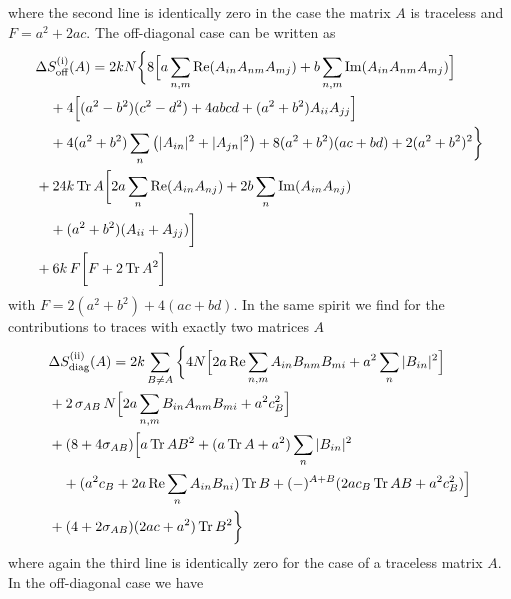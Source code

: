 \documentclass[10pt,a4paper]{article}
\newcommand{\RN}[1]{%
    \textup{\uppercase\expandafter{\romannumeral#1}}%
}
\DeclareMathOperator{\Tr}{Tr}
\begin{document}
where the second line is identically zero in the case the matrix $A$
is traceless and $F=a^2+2ac$.
The off-diagonal case can be written as
\begin{align}
  &\Delta S^{(\RN{1})}_{\text{off}} (A) = 2k N \bigg\{
      8 \Big[ a \sum_{n,m} \operatorname{Re} (A_{in} A_{nm} A_{mj}) +
      b \sum_{n,m} \operatorname{Im} (A_{in} A_{nm} A_{mj}) \Big] \\
      &\quad+4\Big[ (a^2-b^2)(c^2-d^2)+4abcd+(a^2+b^2)A_{ii}A_{jj} \Big]\\
      &\quad+4 (a^2+b^2) \sum_n \left( |A_{in}|^2 + |A_{jn}|^2 \right)
      +8 (a^2+b^2)(ac+bd) + 2(a^2+b^2)^2
   \bigg\} \\
   &+24k \Tr A \bigg[
   2a \sum_n \operatorname{Re} (A_{in} A_{nj})
   +2b \sum_n \operatorname{Im} (A_{in} A_{nj})\\
   &\quad+ (a^2+b^2) (A_{ii}+A_{jj})
 \bigg]\\
 &+6k \, F \bigg[
   F + 2 \Tr A^2
  \bigg]
\end{align}
with $F=2(a^2+b^2)+4(ac+bd)$. In the same spirit we find for the
contributions to traces with exactly two matrices $A$
\begin{align}
  &\Delta S^{(\RN{2})}_{\text{diag}} (A) =
  2k \sum_{B \neq A} \bigg\{ 4N \Big[
      2 a \operatorname{Re} \sum_{n,m} A_{in} B_{nm} B_{mi}
      + a^2 \sum_n |B_{in}|^2
  \Big]\\
  &+2 \, \sigma_{AB}\,N   \Big[
      2 a \sum_{n,m} B_{in} A_{nm} B_{mi}
      + a^2 c_B^2
  \Big]\\
  &+ (8+4\sigma_{AB}) \Big[
    a \Tr AB^2 + (a\Tr A +a^2) \sum_n |B_{in}|^2 \\
    &\quad+ (a^2 c_B + 2a \operatorname{Re} \sum_n A_{in} B_{ni} ) \Tr B
    + (-)^{A+B} (2 a c_B \Tr AB + a^2 c_B^2)
  \Big] \\
  &+ (4+2\sigma_{AB})(2ac+a^2) \Tr B^2
 \bigg\}
\end{align}
where again the third line is identically zero for the case of a
traceless matrix $A$. In the off-diagonal case we have
\end{document}
